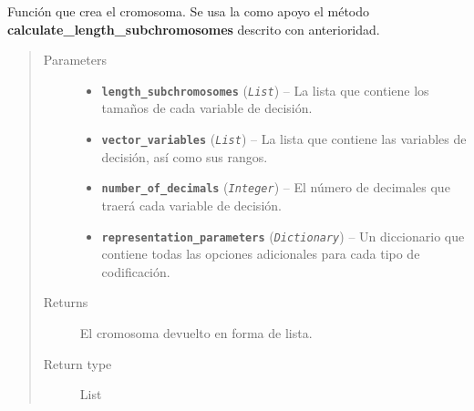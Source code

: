 \documentclass[letterpaper,10pt,english]{sphinxmanual}
\begin{document}
\begin{fulllineitems}
Función que crea el cromosoma. Se usa la como apoyo el método \textbf{calculate\_length\_subchromosomes} descrito con
anterioridad.
\begin{quote}\begin{description}
\item[{Parameters}] \leavevmode\begin{itemize}
\item {} 
\textbf{\texttt{length\_subchromosomes}} (\emph{\texttt{List}}) -- La lista que contiene los tamaños de cada variable de decisión.

\item {} 
\textbf{\texttt{vector\_variables}} (\emph{\texttt{List}}) -- La lista que contiene las variables de decisión, así como sus rangos.

\item {} 
\textbf{\texttt{number\_of\_decimals}} (\emph{\texttt{Integer}}) -- El número de decimales que traerá cada variable de decisión.

\item {} 
\textbf{\texttt{representation\_parameters}} (\emph{\texttt{Dictionary}}) -- Un diccionario que contiene todas las opciones adicionales para cada tipo de
codificación.

\end{itemize}

\item[{Returns}] \leavevmode
El cromosoma devuelto en forma de lista.

\item[{Return type}] \leavevmode
List

\end{description}\end{quote}

\end{fulllineitems}
\end{document}
